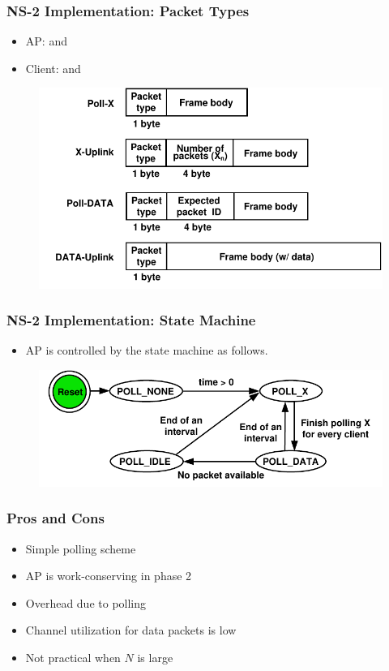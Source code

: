 \documentclass{beamer}
\begin{document}
\begin{frame}
\frametitle{NS-2 Implementation: Packet Types}
\begin{itemize}
\item AP: {\color{red}{Poll-X}} and {\color{red}{Poll-DATA}}
\item Client: {\color{red}{X-Uplink}} and {\color{red}{DATA-Uplink}}
\end{itemize}
\begin{figure}
\centering
\includegraphics[scale=0.7]{header.pdf}
\end{figure}
\end{frame}

\begin{frame}
\frametitle{NS-2 Implementation: State Machine}
\begin{itemize}
\item AP is controlled by the state machine as follows.
\end{itemize}
\begin{figure}
\centering
\includegraphics[scale=0.8]{state_machine.pdf}
\end{figure}
\end{frame}


\begin{frame}
\frametitle{Pros and Cons}
\color{blue}{Pros:}
\begin{itemize}
\item Simple polling scheme
\item AP is work-conserving in phase 2 
\end{itemize}
\color{blue}{Cons:}
\begin{itemize}
\item Overhead due to polling
\item Channel utilization for data packets is low
\item Not practical when $N$ is large
\end{itemize}
\end{frame}
\end{document}
